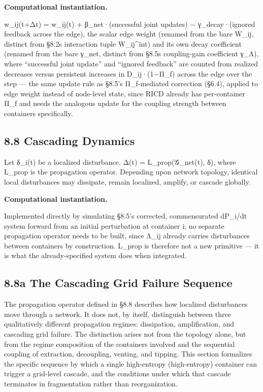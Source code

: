 \documentclass[
]{article}
\begin{document}
\textbf{Computational instantiation.}

w\_ij(t+Δt) = w\_ij(t) + β\_net·(successful joint updates) −
γ\_decay·(ignored feedback across the edge), the scalar edge weight
(renamed from the bare W\_ij, distinct from §8.2s interaction tuple
W\_ij\^{}int) and its own decay coefficient (renamed from the bare
γ\_net, distinct from §8.5s coupling-gain coefficient γ\_Λ), where
``successful joint update'' and ``ignored feedback'' are counted from
realized decreases versus persistent increases in D\_ij·(1−Π\_f) across
the edge over the step --- the same update rule as §8.5's Π\_f-mediated
correction (§6.4), applied to edge weight instead of node-level state,
since RICD already has per-container Π\_f and needs the analogous update
for the coupling strength between containers specifically.

\hypertarget{cascading-dynamics}{%
\subsection{8.8 Cascading Dynamics}\label{cascading-dynamics}}

Let δ\_i(t) be a localized disturbance. Δ(t) = L\_prop(𝒢\_net(t), δ),
where L\_prop is the propagation operator. Depending upon network
topology, identical local disturbances may dissipate, remain localized,
amplify, or cascade globally.

\textbf{Computational instantiation.}

Implemented directly by simulating §8.5's corrected, commensurated
dP\_i/dt system forward from an initial perturbation at container i; no
separate propagation operator needs to be built, since Λ\_ij already
carries disturbances between containers by construction. L\_prop is
therefore not a new primitive --- it is what the already-specified
system does when integrated.

\hypertarget{a-the-cascading-grid-failure-sequence}{%
\subsection{8.8a The Cascading Grid Failure
Sequence}\label{a-the-cascading-grid-failure-sequence}}

The propagation operator defined in §8.8 describes how localized
disturbances move through a network. It does not, by itself, distinguish
between three qualitatively different propagation regimes: dissipation,
amplification, and cascading grid failure. The distinction arises not
from the topology alone, but from the regime composition of the
containers involved and the sequential coupling of extraction,
decoupling, venting, and tipping. This section formalizes the specific
sequence by which a single high-entropy (high-entropy) container can
trigger a grid-level cascade, and the conditions under which that
cascade terminates in fragmentation rather than reorganization.
\end{document}
